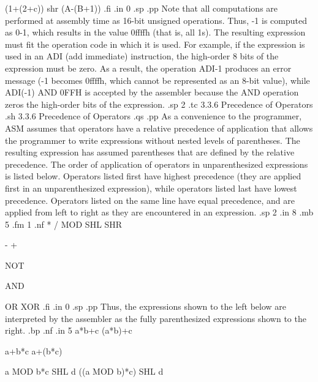 (1+(2+c)) shr (A-(B+1))
.fi
.in 0
.sp
.pp
Note that all computations are performed at assembly time as 16-bit 
unsigned operations.  Thus, -1 is computed as 0-1, which 
results in the value 0ffffh (that is, all 1s).  The resulting 
expression must fit the operation code in which it is used.  For 
example, if the expression is used in an ADI (add immediate) 
instruction, the high-order 8 bits of the expression must be 
zero.  As a result, the operation ADI-1 produces an error message 
(-1 becomes 0ffffh, which cannot be represented as an 8-bit 
value), while ADI(-1) AND 0FFH is accepted by the assembler 
because the AND operation zeros the high-order bits of the 
expression.
.sp 2
.tc         3.3.6  Precedence of Operators
.sh
3.3.6  Precedence of Operators
.qs
.pp
As a convenience to the programmer, ASM assumes that operators 
have a relative precedence of application that allows the 
programmer to write expressions without nested levels of 
parentheses.  The resulting expression has assumed parentheses 
that are defined by the relative precedence.  The order of 
application of operators in unparenthesized expressions is listed 
below.  Operators listed first have highest precedence (they are 
applied first in an unparenthesized expression), while operators 
listed last have lowest precedence.  Operators listed on the same 
line have equal precedence, and are applied from left to right as 
they are encountered in an expression.
.sp 2
.in 8
.mb 5
.fm 1
.nf
* / MOD SHL SHR

- +

NOT

AND

OR XOR
.fi
.in 0
.sp 
.pp
Thus, the expressions shown to the left below are interpreted by 
the assembler as the fully parenthesized expressions shown to the 
right.
.bp
.nf
.in 5
a*b+c                       (a*b)+c 

a+b*c                       a+(b*c)

a MOD b*c SHL d             ((a MOD b)*c) SHL d


